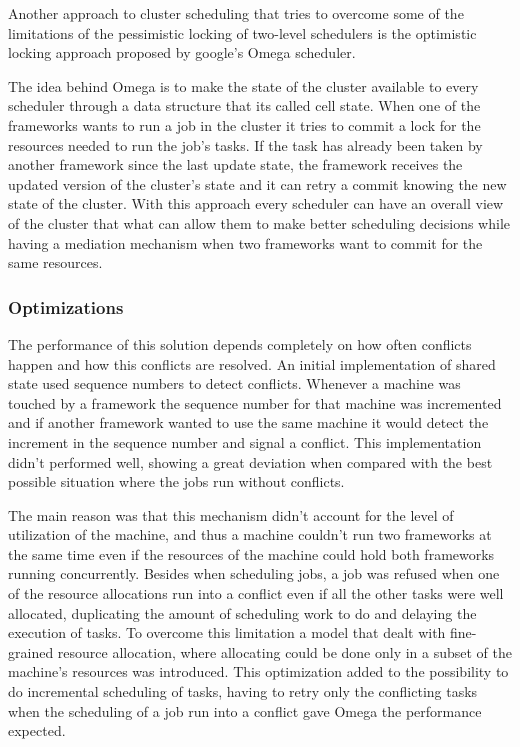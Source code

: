 \documentclass{svjour3}                     %
\begin{document}
Another approach to cluster scheduling that tries to overcome some of
the limitations of the pessimistic locking of two-level schedulers is
the optimistic locking approach proposed by google's Omega
scheduler.

The idea behind Omega is to make the state of the cluster
available to every scheduler through a data structure that its called
cell state. When one of the frameworks wants to run a job in the
cluster it tries to commit a lock for the resources needed to run the
job's tasks. If the task has already been taken by another framework
since the last update state, the framework receives the updated
version of the cluster's state and it can retry a commit knowing the
new state of the cluster. With this approach every scheduler can have
an overall view of the cluster that what can allow them to make better
scheduling decisions while having a mediation mechanism when two
frameworks want to commit for the same resources.

\subsubsection{Optimizations}

The performance of this solution depends completely on how often
conflicts happen and how this conflicts are resolved. An initial
implementation of shared state used sequence numbers to detect
conflicts. Whenever a machine was touched by a framework the sequence
number for that machine was incremented and if another framework
wanted to use the same machine it would detect the increment in the
sequence number and signal a conflict. This implementation didn't
performed well, showing a great deviation when compared with the best
possible situation where the jobs run without conflicts.

The main reason was that this mechanism didn't account for the level
of utilization of the machine, and thus a machine couldn't run two
frameworks at the same time even if the resources of the machine could
hold both frameworks running concurrently. Besides when scheduling
jobs, a job was refused when one of the resource allocations run into
a conflict even if all the other tasks were well allocated,
duplicating the amount of scheduling work to do and delaying the
execution of tasks. To overcome this limitation a model that dealt
with fine-grained resource allocation, where allocating could be done
only in a subset of the machine's resources was introduced. This
optimization added to the possibility to do incremental scheduling of
tasks, having to retry only the conflicting tasks when the scheduling
of a job run into a conflict gave Omega the performance expected.
\end{document}
